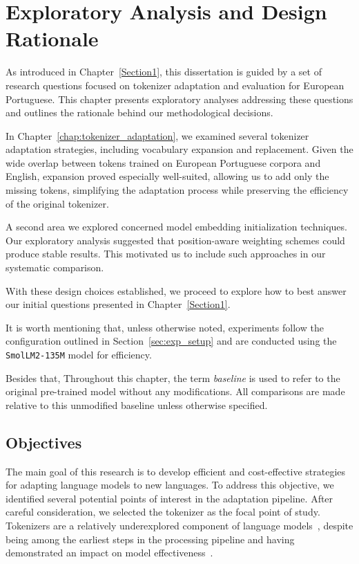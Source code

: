 \chapter{Exploratory Analysis and Design Rationale}
\label{chap:exploration}

As introduced in Chapter~\ref{Section1}, this dissertation is guided by a set of research questions focused on tokenizer adaptation and evaluation for European Portuguese. This chapter presents exploratory analyses addressing these questions and outlines the rationale behind our methodological decisions.

In Chapter~\ref{chap:tokenizer_adaptation}, we examined several tokenizer adaptation strategies, including vocabulary expansion and replacement. Given the wide overlap between tokens trained on European Portuguese corpora and English, expansion proved especially well-suited, allowing us to add only the missing tokens, simplifying the adaptation process while preserving the efficiency of the original tokenizer.

A second area we explored concerned model embedding initialization techniques. Our exploratory analysis suggested that position-aware weighting schemes could produce stable results. This motivated us to include such approaches in our systematic comparison.

With these design choices established, we proceed to explore how to best answer our initial questions presented in Chapter~\ref{Section1}.

It is worth mentioning that, unless otherwise noted, experiments follow the configuration outlined in Section~\ref{sec:exp_setup} and are conducted using the \texttt{SmolLM2-135M} model for efficiency.

Besides that, Throughout this chapter, the term \textit{baseline} is used to refer to the original pre-trained model without any modifications. All comparisons are made relative to this unmodified baseline unless otherwise specified.

\section{Objectives}
The main goal of this research is to develop efficient and cost-effective strategies for adapting language models to new languages. To address this objective, we identified several potential points of interest in the adaptation pipeline. After careful consideration, we selected the tokenizer as the focal point of study. Tokenizers are a relatively underexplored component of language models~\cite{ali2024tokenizer}, despite being among the earliest steps in the processing pipeline and having demonstrated an impact on model effectiveness~\cite{Toraman_2023}.


